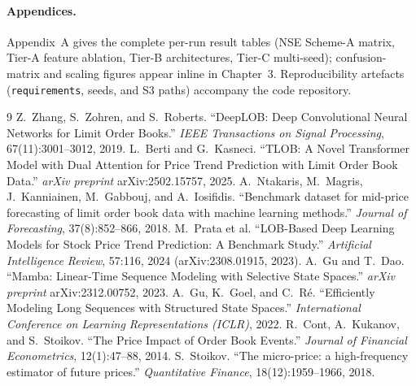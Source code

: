 \documentclass[11pt]{article}
\begin{document}
\paragraph{Appendices.} Appendix~A gives the complete per-run result tables (NSE Scheme-A matrix, Tier-A
feature ablation, Tier-B architectures, Tier-C multi-seed); confusion-matrix and scaling figures appear inline
in Chapter~3. Reproducibility artefacts (\texttt{requirements}, seeds, and S3 paths) accompany the code
repository.

\begin{thebibliography}{9}
\small
{} Z.~Zhang, S.~Zohren, and S.~Roberts. ``DeepLOB: Deep Convolutional Neural Networks for
Limit Order Books.'' \emph{IEEE Transactions on Signal Processing}, 67(11):3001--3012, 2019.
 L.~Berti and G.~Kasneci. ``TLOB: A Novel Transformer Model with Dual Attention for Price Trend
Prediction with Limit Order Book Data.'' \emph{arXiv preprint} arXiv:2502.15757, 2025.
 A.~Ntakaris, M.~Magris, J.~Kanniainen, M.~Gabbouj, and A.~Iosifidis. ``Benchmark dataset for
mid-price forecasting of limit order book data with machine learning methods.'' \emph{Journal of
Forecasting}, 37(8):852--866, 2018.
 M.~Prata et al. ``LOB-Based Deep Learning Models for Stock Price Trend Prediction: A
Benchmark Study.'' \emph{Artificial Intelligence Review}, 57:116, 2024 (arXiv:2308.01915, 2023).
 A.~Gu and T.~Dao. ``Mamba: Linear-Time Sequence Modeling with Selective State Spaces.''
\emph{arXiv preprint} arXiv:2312.00752, 2023.
 A.~Gu, K.~Goel, and C.~R\'e. ``Efficiently Modeling Long Sequences with Structured State
Spaces.'' \emph{International Conference on Learning Representations (ICLR)}, 2022.
 R.~Cont, A.~Kukanov, and S.~Stoikov. ``The Price Impact of Order Book Events.''
\emph{Journal of Financial Econometrics}, 12(1):47--88, 2014.
 S.~Stoikov. ``The micro-price: a high-frequency estimator of future prices.''
\emph{Quantitative Finance}, 18(12):1959--1966, 2018.
\end{thebibliography}


\end{document}
